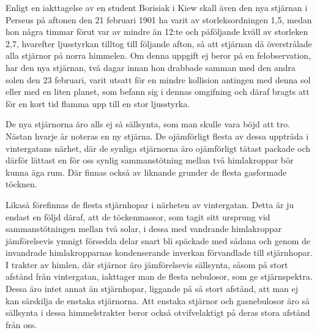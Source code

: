 \documentclass[a4paper, 12pt, oneside, swedish]{article}
\begin{document}
Enligt en iakttagelse av en student Borisiak i Kiew skall även den nya stjärnan i Perseus på aftonen den 21 februari 1901 ha varit av storleksordningen 1,5, medan hon några timmar förut var av mindre än 12:te och påföljande kväll av storleken 2,7, hvarefter ljusstyrkan tilltog till följande afton, så att stjärnan då överstrålade alla stjärnor på norra himmelen. Om denna uppgift ej beror på en felobservation, har den nya stjärnan, två dagar innan hon drabbade samman med den andra solen den 23 februari, varit utsatt för en mindre kollision antingen med denna sol eller med en liten planet, som befann sig i dennas omgifning och däraf bragts att för en kort tid flamma upp till en stor ljusstyrka.

De nya stjärnorna äro alls ej så sällsynta, som man skulle vara böjd att tro. Nästan hvarje år noteras en ny stjärna. De ojämförligt flesta av dessa uppträda i vintergatans närhet, där de synliga stjärnorna äro ojämförligt tätast packade och därför lättast en för oss synlig sammanstötning mellan två himlakroppar bör kunna äga rum. Där finnas också av liknande grunder de flesta gasformade töcknen.

Likaså förefinnas de flesta stjärnhopar i närheten av vintergatan. Detta är ju endast en följd däraf, att de töckenmassor, som tagit sitt ursprung vid sammanstötningen mellan två solar, i dessa med vandrande himlakroppar jämförelsevis ymnigt försedda delar snart bli späckade med sådana och genom de invandrade himlakropparnas kondenserande inverkan förvandlade till stjärnhopar. I trakter av himlen, där stjärnor äro jämförelsevis sällsynta, såsom på stort afstånd från vintergatan, iakttager man de flesta nebulosor, som ge stjärnspektra. Dessa äro intet annat än stjärnhopar, liggande på så stort afstånd, att man ej kan särskilja de enstaka stjärnorna. Att enstaka stjärnor och gasnebulosor äro så sällsynta i dessa himmelstrakter beror också otvifvelaktigt på deras stora afstånd från oss.
\end{document}
